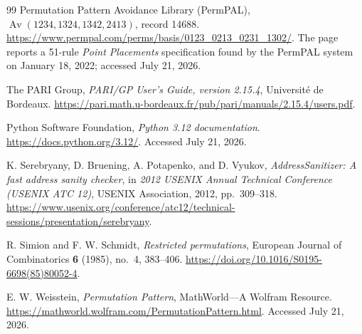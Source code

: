 \documentclass[11pt]{article}
\theoremstyle{definition}
\theoremstyle{remark}
\begin{document}
\begin{thebibliography}{99}
Permutation Pattern Avoidance Library (PermPAL),
\emph{$\operatorname{Av}(1234,1324,1342,2413)$}, record 14688.
\url{https://www.permpal.com/perms/basis/0123_0213_0231_1302/}.
The page reports a 51-rule \emph{Point Placements} specification found by the
PermPAL system on January 18, 2022; accessed July 21, 2026.

The PARI Group,
\emph{PARI/GP User's Guide, version 2.15.4},
Universit\'e de Bordeaux.
\url{https://pari.math.u-bordeaux.fr/pub/pari/manuals/2.15.4/users.pdf}.

Python Software Foundation,
\emph{Python 3.12 documentation}.
\url{https://docs.python.org/3.12/}.
Accessed July 21, 2026.

K. Serebryany, D. Bruening, A. Potapenko, and D. Vyukov,
\emph{AddressSanitizer: A fast address sanity checker},
in \emph{2012 USENIX Annual Technical Conference (USENIX ATC 12)},
USENIX Association, 2012, pp.~309--318.
\url{https://www.usenix.org/conference/atc12/technical-sessions/presentation/serebryany}.

R. Simion and F. W. Schmidt,
\emph{Restricted permutations},
European Journal of Combinatorics \textbf{6} (1985), no.~4, 383--406.
\url{https://doi.org/10.1016/S0195-6698(85)80052-4}.

E. W. Weisstein,
\emph{Permutation Pattern},
MathWorld---A Wolfram Resource.
\url{https://mathworld.wolfram.com/PermutationPattern.html}.
Accessed July 21, 2026.

\end{thebibliography}
\end{document}
